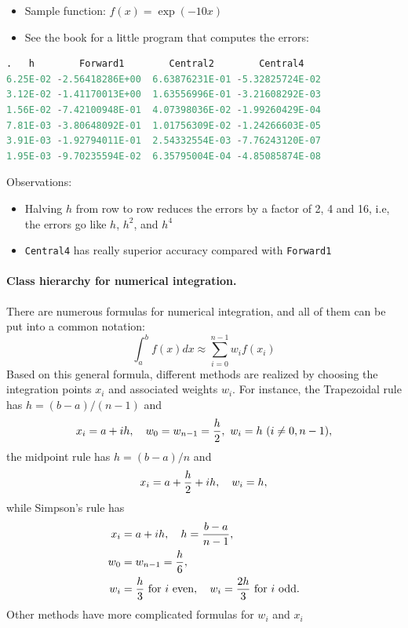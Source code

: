 \documentclass[graybox,envcountchap,sectrefs,final]{svmonodo}
\begin{document}
\begin{itemize}
  \item Sample function: $f(x)=\exp{(-10x)}$

  \item See the book for a little program that computes the errors:
\end{itemize}

\noindent
\begin{lstlisting}[language=Python,style=blue1]
.   h        Forward1        Central2        Central4
6.25E-02 -2.56418286E+00  6.63876231E-01 -5.32825724E-02
3.12E-02 -1.41170013E+00  1.63556996E-01 -3.21608292E-03
1.56E-02 -7.42100948E-01  4.07398036E-02 -1.99260429E-04
7.81E-03 -3.80648092E-01  1.01756309E-02 -1.24266603E-05
3.91E-03 -1.92794011E-01  2.54332554E-03 -7.76243120E-07
1.95E-03 -9.70235594E-02  6.35795004E-04 -4.85085874E-08
\end{lstlisting}

Observations:

\begin{itemize}
  \item Halving $h$ from row to row reduces the errors by a factor of 2, 4 and 16, i.e, the errors go like $h$, $h^2$, and $h^4$

  \item \texttt{Central4} has really superior accuracy compared with \texttt{Forward1}
\end{itemize}

\noindent
\paragraph{Class hierarchy for numerical integration.}
There are numerous formulas for numerical integration, and
all of them can be put into a common notation:
\[ \int_a^b f(x)dx \approx \sum_{i=0}^{n-1} w_i f(x_i)\]
Based on this general formula, different methods are realized by choosing the integration points
$x_i$ and associated weights $w_i$. For instance, the Trapezoidal rule has $h=(b-a)/(n-1)$ and
\[ x_i = a+ih, \quad w_0=w_{n-1}={h\over2},\ w_i=h\ (i\neq 0,n-1) ,
\]
the midpoint rule has $h=(b-a)/n$ and
\[ x_i = a + {h\over 2} + ih,\quad w_i=h ,\]
while Simpson's rule has
\begin{align*}
x_i &= a+ih,\quad h={b-a\over n-1}, \\ 
w_0 &=w_{n-1}={h\over6}, \\ 
w_i &= {h\over3}\hbox{ for }i\hbox{ even},\quad w_i={2h\over3}\hbox{ for }i\hbox{ odd} .
\end{align*}
Other methods have more complicated formulas for $w_i$ and $x_i$
\end{document}
